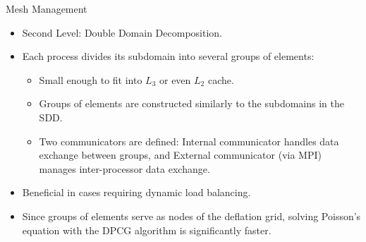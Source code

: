 \documentclass[10pt]{beamer}
\begin{document}
\begin{frame}{Mesh Management}
\begin{itemize}
\item[\large\ding{113}] {\color{um6pcolor}Second Level}: Double Domain Decomposition.
\item[\large\ding{113}] Each process divides its subdomain into several groups of elements:
\begin{itemize}
\justifying
\item[\large\ding{52}] Small enough to fit into $L_3$ or even $L_2$ cache.
\item[\large\ding{52}] Groups of elements are constructed similarly to the subdomains in the SDD.
\item[\large\ding{52}] Two communicators are defined: Internal communicator handles data exchange between groups, and External communicator (via MPI) manages inter-processor data exchange.
\end{itemize}
\begin{center}
\end{center}
\item[\large\ding{113}] Beneficial in cases requiring dynamic load balancing.
\item[\large\ding{113}] Since groups of elements serve as nodes of the deflation grid, solving Poisson’s equation with the DPCG algorithm is significantly faster.
\end{itemize} 
\end{frame}
\end{document}

